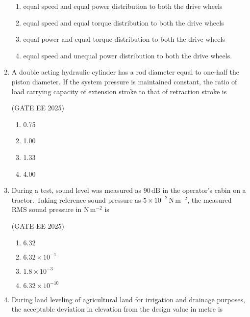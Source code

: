 \documentclass[journal,12pt,onecolumn]{IEEEtran}
\theoremstyle{remark}
\begin{document}
\begin{enumerate}
\begin{enumerate}
    \item equal speed and equal power distribution to both the drive wheels  
    \item equal speed and equal torque distribution to both the drive wheels 
    \item equal power and equal torque distribution to both the drive wheels 
    \item equal speed and unequal power distribution to both the drive wheels.
\end{enumerate}
\vspace{0.3cm}
\item A double acting hydraulic cylinder has a rod diameter equal to one-half the piston diameter. If the system pressure is maintained constant, the ratio of load carrying capacity of extension stroke to that of retraction stroke is\

\hfill(GATE EE 2025)

\begin{multicols}{4}
\begin{enumerate}
    \item 0.75
    \item 1.00
    \item 1.33
    \item 4.00
\end{enumerate}
\end{multicols}

\item During a test, sound level was measured as $90\,\mathrm{dB}$ in the operator's cabin on a tractor. Taking reference sound pressure as $5\times10^{-2}\,\mathrm{N\,m^{-2}}$, the measured RMS sound pressure in $\mathrm{N\,m^{-2}}$ is\

\hfill(GATE EE 2025)

\begin{multicols}{4}
    \begin{enumerate}
        \item $6.32$
        \item $6.32\times10^{-1}$
        \item $1.8\times10^{-3}$
        \item $6.32\times10^{-10}$
    \end{enumerate}
\end{multicols}

\item During land leveling of agricultural land for irrigation and drainage purposes, the acceptable deviation in elevation from the design value in metre is\


\end{enumerate}
\end{document}
